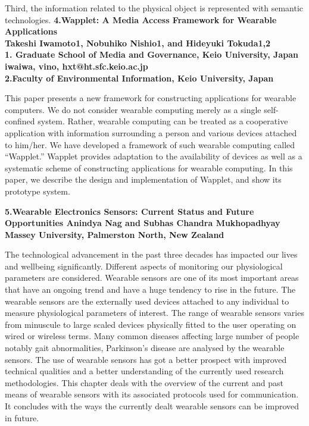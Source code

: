 \documentclass[12pt,a4paper]{report}
\begin{document}
Third, the information related to the physical object is represented with semantic technologies.
\newpage
\textbf{4.Wapplet: A Media Access Framework for	Wearable Applications\\
	Takeshi Iwamoto1, Nobuhiko Nishio1, and Hideyuki Tokuda1,2\\
	1. Graduate School of Media and Governance, Keio University, Japan
	{iwaiwa, vino, hxt}@ht.sfc.keio.ac.jp\\
	2.Faculty of Environmental Information, Keio University, Japan}

This paper presents a new framework for constructing applications for wearable computers. We do not consider wearable computing merely as a single self-confined system. Rather, wearable computing can be treated as a cooperative application with information surrounding a person and various devices attached to him/her. We have developed a framework of such wearable computing called “Wapplet.” Wapplet provides
adaptation to the availability of devices as well as a systematic scheme of constructing applications for wearable computing. In this paper, we describe the design and implementation of Wapplet, and show its prototype system.

\textbf{5.Wearable Electronics Sensors: Current Status and Future Opportunities
	Anindya Nag and Subhas Chandra Mukhopadhyay Massey University, Palmerston North, New Zealand}

The technological advancement in the past three decades has impacted our lives and wellbeing significantly. Different aspects of monitoring our physiological parameters are considered. Wearable sensors are one of its most important areas that have an ongoing trend and have a huge tendency to rise in the future. The wearable sensors are the externally used devices attached to any individual to measure physiological parameters of interest. The range of wearable sensors varies from minuscule to large scaled devices physically fitted to the user operating on wired or wireless terms. Many common diseases affecting large number of people notably gait abnormalities, Parkinson’s disease are analysed by the wearable sensors. The use of wearable sensors has got a better prospect with improved technical qualities and a better understanding of the currently used research methodologies. This chapter deals with the overview of the current and past means of wearable sensors with its associated protocols used for communication. It concludes with the ways the currently dealt wearable sensors can be improved in future.
\end{document}
